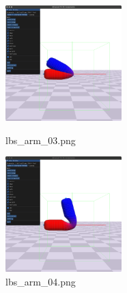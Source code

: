 \documentclass[a4paper,10pt,uplatex,dvipdfmx]{jsarticle}
\begin{document}
\begin{itemize}
  \begin{figure}[H]
    \begin{minipage}{0.33\hsize}
      \begin{center}
        \includegraphics[width=45mm]{img/lbs_arm_03.png}
        \caption{lbs\_arm\_03.png}
      \end{center}
    \end{minipage}
    \begin{minipage}{0.33\hsize}
      \begin{center}
        \includegraphics[width=45mm]{img/lbs_arm_04.png}
        \caption{lbs\_arm\_04.png}
      \end{center}
    \end{minipage}
  \end{figure}


\end{itemize}
\end{document}
